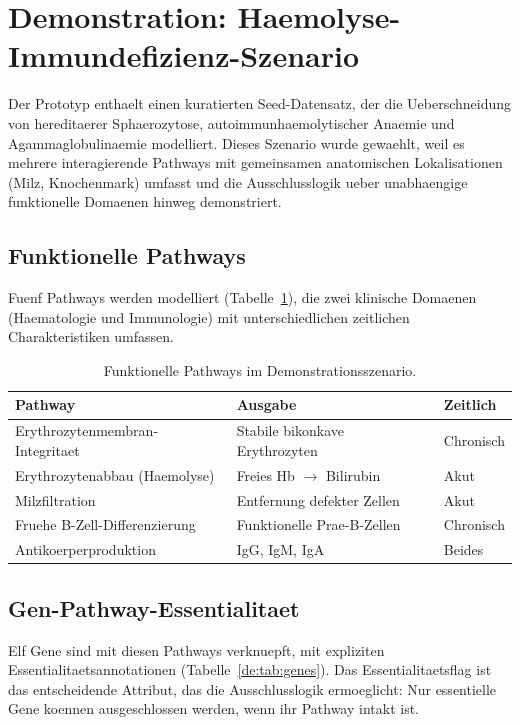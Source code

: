 \documentclass[12pt,a4paper]{article}
\begin{document}
\section*{Demonstration: Haemolyse-Immundefizienz-Szenario}
\label{de:sec:demo}

Der Prototyp enthaelt einen kuratierten Seed-Datensatz, der die Ueberschneidung von hereditaerer Sphaerozy\-tose, autoimmunhaemolytischer Anaemie und Agammaglobulinaemie modelliert. Dieses Szenario wurde gewaehlt, weil es mehrere interagierende Pathways mit gemeinsamen anatomischen Lokalisationen (Milz, Knochenmark) umfasst und die Ausschlusslogik ueber unabhaengige funktionelle Domaenen hinweg demonstriert.

\subsection*{Funktionelle Pathways}

Fuenf Pathways werden modelliert (Tabelle~\ref{de:tab:pathways}), die zwei klinische Domaenen (Haematologie und Immunologie) mit unterschiedlichen zeitlichen Charakteristiken umfassen.

\begin{table}[H]
\centering
\caption{Funktionelle Pathways im Demonstrationsszenario.}
\label{de:tab:pathways}
\begin{tabular}{lll}
\toprule
\textbf{Pathway} & \textbf{Ausgabe} & \textbf{Zeitlich} \\
\midrule
Erythrozytenmembran-Integritaet & Stabile bikonkave Erythrozyten & Chronisch \\
Erythrozytenabbau (Haemolyse) & Freies Hb $\to$ Bilirubin & Akut \\
Milzfiltration & Entfernung defekter Zellen & Akut \\
Fruehe B-Zell-Differenzierung & Funktionelle Prae-B-Zellen & Chronisch \\
Antikoerperproduktion & IgG, IgM, IgA & Beides \\
\bottomrule
\end{tabular}
\end{table}

\subsection*{Gen-Pathway-Essentialitaet}

Elf Gene sind mit diesen Pathways verknuepft, mit expliziten Essentialitaetsannotationen (Tabelle~\ref{de:tab:genes}). Das Essentialitaetsflag ist das entscheidende Attribut, das die Ausschlusslogik ermoeglicht: Nur essentielle Gene koennen ausgeschlossen werden, wenn ihr Pathway intakt ist.
\end{document}
